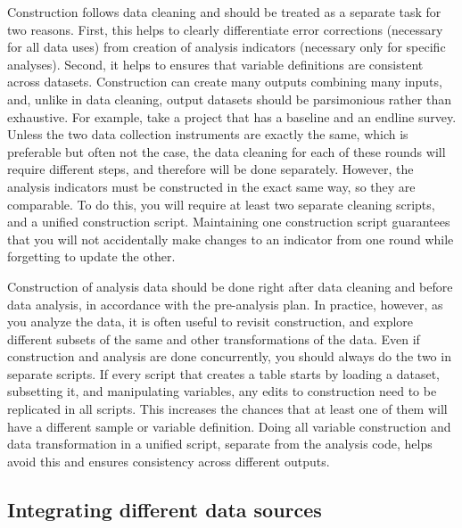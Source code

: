 Construction follows data cleaning and 
should be treated as a separate task for two reasons.
First, this helps to clearly differentiate error corrections 
(necessary for all data uses)
from creation of analysis indicators 
(necessary only for specific analyses).
Second, it helps to ensures that variable definitions are
consistent across datasets.
Construction can create many outputs combining many inputs,
and, unlike in data cleaning,
output datasets should be parsimonious rather than exhaustive.
For example, take a project that has a baseline and an endline survey.
Unless the two data collection instruments are exactly the same,
which is preferable but often not the case,
the data cleaning for each of these rounds will require different steps,
and therefore will be done separately.
However, the analysis indicators must be constructed in the exact same way,
so they are comparable.
To do this, you will require at least two separate cleaning scripts,
and a unified construction script.
Maintaining one construction script guarantees that you will not
accidentally make changes to an indicator from one round
while forgetting to update the other.

Construction of analysis data should be done right
after data cleaning and before data analysis,
in accordance with the pre-analysis plan.
In practice, however, as you analyze the data,
it is often useful to revisit construction,
and explore different subsets of the same and other transformations of the data.
Even if construction and analysis are done concurrently,
you should always do the two in separate scripts.
If every script that creates a table starts by loading a dataset,
subsetting it, and manipulating variables,
any edits to construction need to be replicated in all scripts.
This increases the chances that at least one of them
will have a different sample or variable definition.
Doing all variable construction and data transformation
in a unified script, separate from the analysis code, helps
avoid this and ensures consistency across different outputs.

\subsection{Integrating different data sources}

